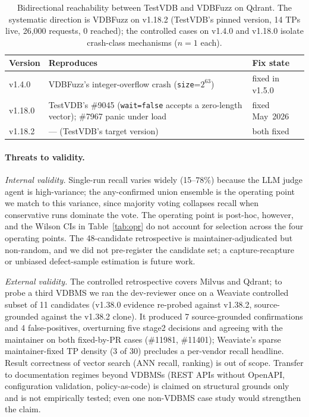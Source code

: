 \documentclass[sigconf]{acmart}
\begin{document}
\begin{table}[t]
\caption{Bidirectional reachability between TestVDB and VDBFuzz on Qdrant. The systematic direction is VDBFuzz on v1.18.2 (TestVDB's pinned version, 14 TPs live, 26{,}000 requests, 0 reached); the controlled cases on v1.4.0 and v1.18.0 isolate crash-class mechanisms ($n{=}1$ each).}
\label{tab:versions}
\small
\begin{tabular}{@{}p{}p{}p{}@{}}
\toprule
Version & Reproduces & Fix state \\
\midrule
v1.4.0 & VDBFuzz's integer-overflow crash (\texttt{size}=$2^{63}$) & fixed in v1.5.0 \\
v1.18.0 & TestVDB's \#9045 (\texttt{wait=false} accepts a zero-length vector); \#7967 panic under load & fixed May~2026 \\
v1.18.2 & --- (TestVDB's target version) & both fixed \\
\bottomrule
\end{tabular}
\end{table}

\paragraph{Threats to validity.}
\emph{Internal validity.} Single-run recall varies widely (15--78\%) because the LLM judge agent is high-variance; the any-confirmed union ensemble is the operating point we match to this variance, since majority voting collapses recall when conservative runs dominate the vote. The operating point is post-hoc, however, and the Wilson CIs in Table~\ref{tab:opr} do not account for selection across the four operating points. The 48-candidate retrospective is maintainer-adjudicated but non-random, and we did not pre-register the candidate set; a capture-recapture or unbiased defect-sample estimation is future work.

\emph{External validity.} The controlled retrospective covers Milvus and Qdrant; to probe a third VDBMS we ran the dev-reviewer once on a Weaviate controlled subset of 11 candidates (v1.38.0 evidence re-probed against v1.38.2, source-grounded against the v1.38.2 clone). It produced 7 source-grounded confirmations and 4 false-positives, overturning five stage2 decisions and agreeing with the maintainer on both fixed-by-PR cases (\#11981, \#11401); Weaviate's sparse maintainer-fixed TP density (3 of 30) precludes a per-vendor recall headline. Result correctness of vector search (ANN recall, ranking) is out of scope. Transfer to documentation regimes beyond VDBMSs (REST APIs without OpenAPI, configuration validation, policy-as-code) is claimed on structural grounds only and is not empirically tested; even one non-VDBMS case study would strengthen the claim.
\end{document}
